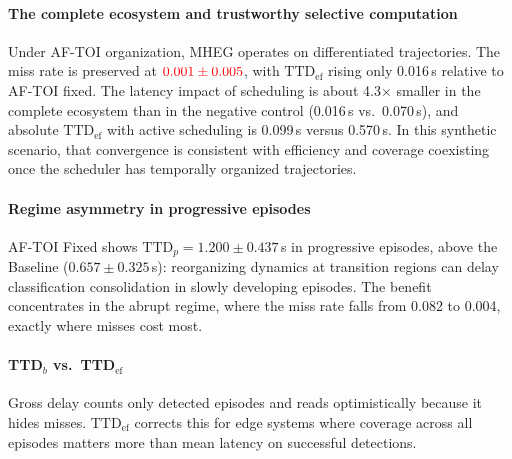 \documentclass[a4paper,fleqn]{cas-dc}
\newcommand{\AFTOI}{\mbox{AF-TOI}\xspace}
\newcommand{\MHEG}{\mbox{MHEG}\xspace}
\begin{document}
\paragraph{The complete ecosystem and trustworthy selective computation}
Under \AFTOI organization, \MHEG operates on differentiated trajectories. The
miss rate is preserved at ${\color{red}0.001 \pm 0.005}$, with
$\mathrm{TTD}_{\mathrm{ef}}$ rising only {\color{\revcolor}0.016}\,s relative to \AFTOI fixed. The
latency impact of scheduling is about {\color{\revcolor}4.3}$\times$ smaller in the complete
ecosystem than in the negative control {\color{\revcolor}(0.016\,s vs.\ 0.070\,s)}, and absolute
$\mathrm{TTD}_{\mathrm{ef}}$ with active scheduling is {\color{\revcolor}0.099\,s versus 0.570\,s}.
In this synthetic scenario, that convergence is consistent with efficiency and
coverage coexisting once the scheduler has temporally organized trajectories.
\paragraph{Regime asymmetry in progressive episodes}
\AFTOI Fixed shows {\color{\revcolor}$\text{TTD}_p = 1.200 \pm 0.437$}\,s in progressive episodes,
above the Baseline {\color{\revcolor}($0.657 \pm 0.325$\,s)}: reorganizing dynamics at transition
regions can delay classification consolidation in slowly developing episodes.
The benefit concentrates in the abrupt regime, where the miss rate falls from
{\color{\revcolor}0.082 to 0.004}, exactly where misses cost most.
\paragraph{TTD$_b$ vs.\ TTD$_{\mathrm{ef}}$}
Gross delay counts only detected episodes and reads optimistically because it
hides misses. $\mathrm{TTD}_{\mathrm{ef}}$ corrects this for edge systems where
coverage across all episodes matters more than mean latency on successful
detections.
\end{document}
